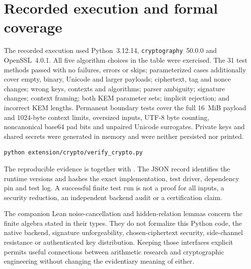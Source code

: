 \section{Recorded execution and formal coverage}

The recorded execution used Python~3.12.14,
\texttt{cryptography}~50.0.0 and OpenSSL~4.0.1. All five algorithm choices in the
table were exercised. The 31 test methods passed with no failures, errors or
skips; parameterized cases additionally cover empty, binary, Unicode and larger
payloads; ciphertext, tag and nonce changes; wrong keys, contexts and algorithms;
parser ambiguity; signature changes; context framing; both KEM parameter sets;
implicit rejection; and incorrect KEM lengths. Permanent boundary tests cover
the full 16~MiB payload and 1024-byte context limits, oversized inputs,
UTF-8 byte counting, noncanonical base64 pad bits and unpaired Unicode
surrogates. Private keys and shared secrets
were generated in memory and were neither persisted nor printed.

\begin{lstlisting}
python extension/crypto/verify_crypto.py
\end{lstlisting}

The reproducible evidence is  together
with . The JSON record identifies the
runtime versions and hashes the exact implementation, test driver, dependency
pin and test log. A successful finite test run is not a proof for all inputs,
a security reduction, an independent backend audit or a certification claim.

The companion Lean noise-cancellation and hidden-relation lemmas concern the
finite algebra stated in their types. They do not formalize this Python code,
the native backend, signature unforgeability, chosen-ciphertext security,
side-channel resistance or authenticated key distribution. Keeping those
interfaces explicit permits useful connections between arithmetic research and
cryptographic engineering without changing the evidentiary meaning of either.
